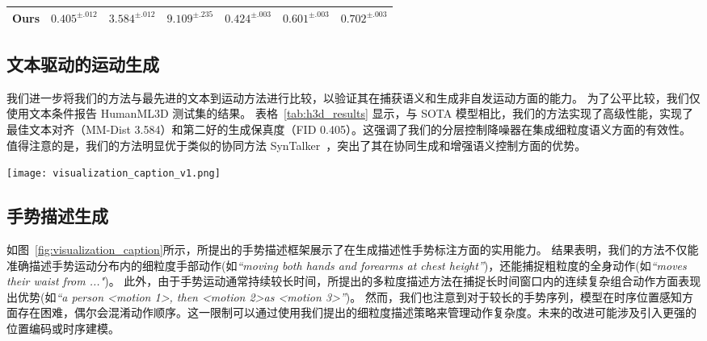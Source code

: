 \begin{table*}[t]
\begin{tabular}{l cccccc}
  \midrule
  Ours  & $0.405^{\pm .012}$ & $3.584^{\pm .012}$ & $9.109^{\pm .235}$  & $0.424^{\pm .003}$ &$0.601^{\pm .003}$ & $0.702^{\pm .003}$ \\
  \bottomrule
  \end{tabular}
\end{table*}

\subsection{文本驱动的运动生成}
\label{sec:exp_t2m}
我们进一步将我们的方法与最先进的文本到运动方法进行比较，以验证其在捕获语义和生成非自发运动方面的能力。
为了公平比较，我们仅使用文本条件报告 HumanML3D 测试集的结果。
表格~\ref{tab:h3d_results} 显示，与 SOTA 模型相比，我们的方法实现了高级性能，实现了最佳文本对齐（MM-Dist 3.584）和第二好的生成保真度（FID 0.405）。这强调了我们的分层控制降噪器在集成细粒度语义方面的有效性。
值得注意的是，我们的方法明显优于类似的协同方法 SynTalker~\cite{chen2024syntalker}，突出了其在协同生成和增强语义控制方面的优势。


\begin{figure*}[t]
  \centering
  \texttt{[image: visualization\_caption\_v1.png]}
  \caption{手势描述生成结果示例。生成的描述准确地描述了整体运动模式和细粒度的手势细节。}
  \label{fig:visualization_caption}
\end{figure*}
\subsection{手势描述生成}
如图~\ref{fig:visualization_caption}所示，所提出的手势描述框架展示了在生成描述性手势标注方面的实用能力。
结果表明，我们的方法不仅能准确描述手势运动分布内的细粒度手部动作(如\textit{``moving both hands and forearms at chest height''})，还能捕捉粗粒度的全身动作(如\textit{``moves their waist from ..."})。
此外，由于手势运动通常持续较长时间，所提出的多粒度描述方法在捕捉长时间窗口内的连续复杂组合动作方面表现出优势(如\textit{``a person \textless motion 1\textgreater, then \textless motion 2\textgreater as \textless motion 3\textgreater''})。
然而，我们也注意到对于较长的手势序列，模型在时序位置感知方面存在困难，偶尔会混淆动作顺序。这一限制可以通过使用我们提出的细粒度描述策略来管理动作复杂度。未来的改进可能涉及引入更强的位置编码或时序建模。

